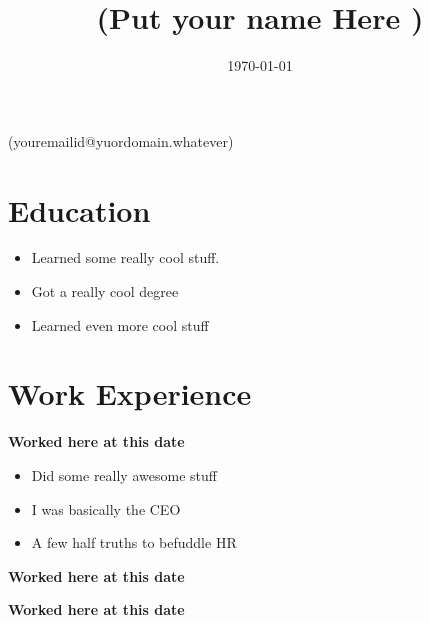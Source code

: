 \documentclass{article}
\title{  (Put your name Here ) }
\begin{document}
\date{\today}

\begin{center} (youremailid@yuordomain.whatever)         \end{center}



\section*{Education}
\begin{itemize}
\item Learned some really cool stuff.
\item Got a really cool degree
\item Learned even more cool stuff

\end{itemize}

\section*{Work Experience}
\textbf{ Worked here at this date }
\begin{itemize}
\item Did some really awesome stuff
\item I was basically the CEO
\item A few half truths to befuddle HR

\end{itemize}

\textbf{ Worked here at this date}

\textbf{ Worked here at this date}
    

  
\end{document}
